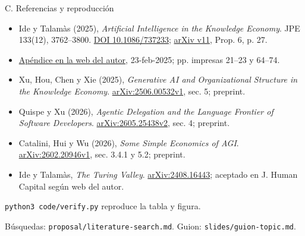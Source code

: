 \documentclass[aspectratio=169,11pt]{beamer}
\begin{document}
\begin{frame}{C. Referencias y reproducción}
\footnotesize
\begin{itemize}
\item Ide y Talamàs (2025), \emph{Artificial Intelligence in the Knowledge Economy}. JPE 133(12), 3762--3800. \href{https://doi.org/10.1086/737233}{DOI 10.1086/737233}; \href{https://arxiv.org/abs/2312.05481v11}{arXiv v11}, Prop. 6, p. 27.
\item \href{https://www.eduardtalamas.com/}{Apéndice en la web del autor}, 23-feb-2025; pp. impresas 21--23 y 64--74.
\item Xu, Hou, Chen y Xie (2025), \emph{Generative AI and Organizational Structure in the Knowledge Economy}. \href{https://arxiv.org/abs/2506.00532v1}{arXiv:2506.00532v1}, sec. 5; preprint.
\item Quispe y Xu (2026), \emph{Agentic Delegation and the Language Frontier of Software Developers}. \href{https://arxiv.org/abs/2605.25438v2}{arXiv:2605.25438v2}, sec. 4; preprint.
\item Catalini, Hui y Wu (2026), \emph{Some Simple Economics of AGI}. \href{https://arxiv.org/abs/2602.20946v1}{arXiv:2602.20946v1}, sec. 3.4.1 y 5.2; preprint.
\item Ide y Talamàs, \emph{The Turing Valley}. \href{https://arxiv.org/abs/2408.16443}{arXiv:2408.16443}; aceptado en J. Human Capital según web del autor.
\end{itemize}
\medskip
\texttt{python3 code/verify.py} reproduce la tabla y figura.\par
Búsquedas: \texttt{proposal/literature-search.md}. Guion: \texttt{slides/guion-topic.md}.
\end{frame}
\end{document}
